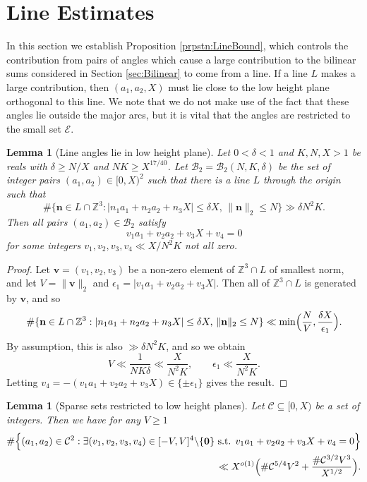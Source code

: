 \documentclass[10pt]{amsart}
\theoremstyle{plain}
\newtheorem{lmm}[thrm]{Lemma}
\numberwithin{sblmm}{thrm}
\numberwithin{equation}{section}
\begin{document}
\section{Line Estimates} \label{sec:Line}
%
%
%
%
In this section we establish Proposition \ref{prpstn:LineBound}, which controls the contribution from pairs of angles which cause a large contribution to the bilinear sums considered in Section \ref{sec:Bilinear} to come from a line. If a line $L$ makes a large contribution, then $(a_1,a_2,X)$ must lie close to the low height plane orthogonal to this line. We note that we do not make use of the fact that these angles lie outside the major arcs, but it is vital that the angles are restricted to the small set $\mathcal{E}$.
%
%
%
%
\begin{lmm}[Line angles lie in low height plane]\label{lmm:Line}
%
Let $0<\delta<1$ and $K,N,X>1$ be reals with $\delta\ge N/X$ and $N K\ge X^{17/40}$. Let $\mathcal{B}_2=\mathcal{B}_2(N,K,\delta)$ be the set of integer pairs $(a_1,a_2)\in[0,X)^2$ such that there is a line $L$ through the origin such that
\[
\#\{\mathbf{n}\in L\cap\mathbb{Z}^3: |n_1a_1+n_2a_2+n_3X|\le \delta X,\,\|\mathbf{n}\|_2\le N\}\gg \delta N^2 K.
\]
Then all pairs $(a_1,a_2)\in\mathcal{B}_2$ satisfy
\[
v_1a_1+v_2 a_2+v_3 X+v_4=0
\]
for some integers $v_1,v_2,v_3,v_4\ll  X/N^2K$ not all zero.
%
\end{lmm}
%
%
%
%
\begin{proof}
%
Let $\mathbf{v}=(v_1,v_2,v_3)$ be a non-zero element of $\mathbb{Z}^3\cap L$ of smallest norm, and let $V=\|\mathbf{v}\|_2$ and $\epsilon_1=|v_1a_1+v_2a_2+v_3X|$. Then all of $\mathbb{Z}^3\cap L$ is generated by $\mathbf{v}$, and so
\[
\#\{\mathbf{n}\in L\cap\mathbb{Z}^3: |n_1a_1+n_2a_2+n_3X|\le \delta X,\,\|\mathbf{n}\|_2\le N\}\ll \min\Bigl(\frac{N}{V},\frac{\delta X}{\epsilon_1}\Bigr).
\]
By assumption, this is also $\gg \delta N^2K$, and so we obtain
\[
V\ll \frac{1}{N K\delta}\ll \frac{X}{N^2K},\qquad \epsilon_1\ll \frac{X}{N^2K}.
\]
Letting $v_4=-(v_1a_1+v_2a_2+v_3X)\in\{\pm \epsilon_1\}$ gives the result.
%
\end{proof}
%
%
%
%
\begin{lmm}[Sparse sets restricted to low height planes] \label{lmm:LineBound}
%
Let $\mathcal{C}\subseteq[0,X)$ be a set of integers. Then we have for any $V\ge 1$
\[
\begin{split}
\#\Bigl\{(a_1,a_2)\in\mathcal{C}^2:\exists (v_1,v_2,v_3,v_4)\in[-V,V]^4\backslash\{\mathbf{0}\}\text{ s.t. }v_1a_1+v_2a_2+v_3 X+v_4=0\Bigr\}\\
\ll X^{o(1)}\Bigl(\#\mathcal{C}^{5/4}V^2+\frac{\#\mathcal{C}^{3/2}V^{3}}{X^{1/2}}\Bigr).\end{split}
\]
%
\end{lmm}
\end{document}
